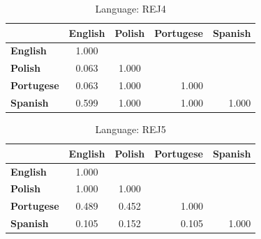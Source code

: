 \begin{table}
    \small
    \centering
    \begin{tabular}{lcccc}
        \toprule
                           & \multicolumn{1}{l}{\textbf{English}} & \multicolumn{1}{l}{\textbf{Polish}} & \textbf{Portugese}        & \textbf{Spanish}          \\
        \midrule
        \textbf{English}   & 1.000                                & \multicolumn{1}{l}{}                &                           &                           \\
        \textbf{Polish}    & 0.063                                & 1.000                               &                           &                           \\
        \textbf{Portugese} & 0.063                                & 1.000                               & \multicolumn{1}{r}{1.000} &                           \\
        \textbf{Spanish}   & 0.599                                & 1.000                               & \multicolumn{1}{r}{1.000} & \multicolumn{1}{r}{1.000} \\
        \bottomrule
    \end{tabular}
    \caption{Language: REJ4}
\end{table}


\begin{table}
    \small
    \centering
    \begin{tabular}{lcccc}
        \toprule
                           & \multicolumn{1}{l}{\textbf{English}} & \multicolumn{1}{l}{\textbf{Polish}} & \textbf{Portugese}        & \textbf{Spanish}          \\
        \midrule
        \textbf{English}   & 1.000                                & \multicolumn{1}{l}{}                &                           &                           \\
        \textbf{Polish}    & 1.000                                & 1.000                               &                           &                           \\
        \textbf{Portugese} & 0.489                                & 0.452                               & \multicolumn{1}{r}{1.000} &                           \\
        \textbf{Spanish}   & 0.105                                & 0.152                               & \multicolumn{1}{r}{0.105} & \multicolumn{1}{r}{1.000} \\
        \bottomrule
    \end{tabular}
    \caption{Language: REJ5}
\end{table}

